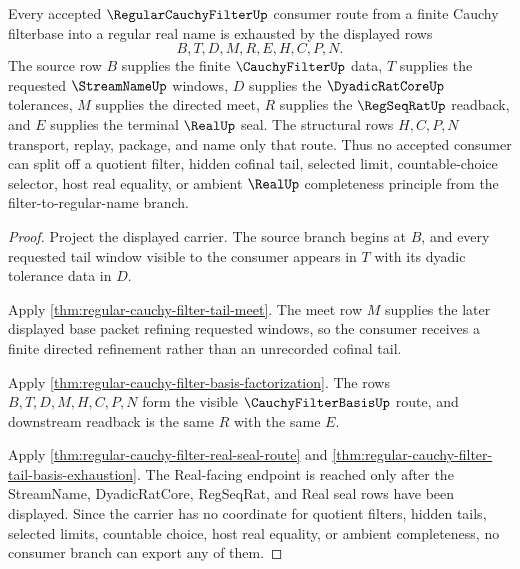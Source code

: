 \begin{theorem}
\label{thm:regular-cauchy-filter-branch-exhaustion}
Every accepted $\RegularCauchyFilterUp$ consumer route from a finite Cauchy filterbase into a regular real name is exhausted by the displayed rows
$$
B,T,D,M,R,E,H,C,P,N .
$$
The source row $B$ supplies the finite $\CauchyFilterUp$ data, $T$ supplies the requested $\StreamNameUp$ windows, $D$ supplies the $\DyadicRatCoreUp$ tolerances, $M$ supplies the directed meet, $R$ supplies the $\RegSeqRatUp$ readback, and $E$ supplies the terminal $\RealUp$ seal. The structural rows $H,C,P,N$ transport, replay, package, and name only that route. Thus no accepted consumer can split off a quotient filter, hidden cofinal tail, selected limit, countable-choice selector, host real equality, or ambient $\RealUp$ completeness principle from the filter-to-regular-name branch.
\end{theorem}
\begin{proof}
Project the displayed carrier. The source branch begins at $B$, and every requested tail window visible to the consumer appears in $T$ with its dyadic tolerance data in $D$.

Apply \autoref{thm:regular-cauchy-filter-tail-meet}. The meet row $M$ supplies the later displayed base packet refining requested windows, so the consumer receives a finite directed refinement rather than an unrecorded cofinal tail.

Apply \autoref{thm:regular-cauchy-filter-basis-factorization}. The rows $B,T,D,M,H,C,P,N$ form the visible $\CauchyFilterBasisUp$ route, and downstream readback is the same $R$ with the same $E$.

Apply \autoref{thm:regular-cauchy-filter-real-seal-route} and \autoref{thm:regular-cauchy-filter-tail-basis-exhaustion}. The Real-facing endpoint is reached only after the StreamName, DyadicRatCore, RegSeqRat, and Real seal rows have been displayed. Since the carrier has no coordinate for quotient filters, hidden tails, selected limits, countable choice, host real equality, or ambient completeness, no consumer branch can export any of them.
\end{proof}

